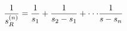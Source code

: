 \begin{equation}
{1\over s_R^{(n)}}= {1\over s_1}+{1\over s_2-s_1}  +\cdot\cdot\cdot {1\over s -s_n}
\end{equation}

